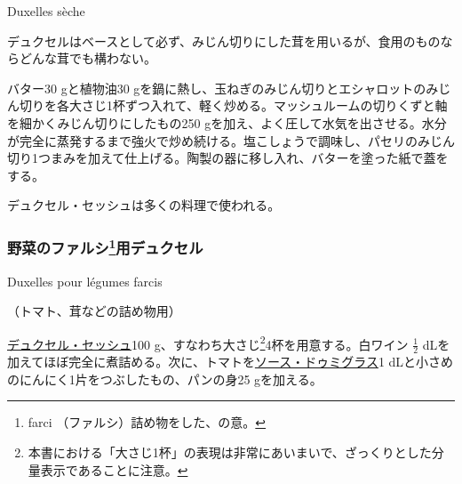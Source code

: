 \begin{recette}
\begin{frsubenv}

Duxelles sèche

\end{frsubenv}


デュクセルはベースとして必ず、みじん切りにした茸を用いるが、食用のものならどんな茸でも構わない。

バター30 gと植物油30
gを鍋に熱し、玉ねぎのみじん切りとエシャロットのみじん切りを各大さじ1杯ずつ入れて、軽く炒める。マッシュルームの切りくずと軸を細かくみじん切りにしたもの250
gを加え、よく圧して水気を出させる。水分が完全に蒸発するまで強火で炒め続ける。塩こしょうで調味し、パセリのみじん切り1つまみを加えて仕上げる。陶製の器に移し入れ、バターを塗った紙で蓋をする。

デュクセル・セッシュは多くの料理で使われる。

\atoaki{}

\hypertarget{duxelles-pour-legumes-farcis}{%
\subsubsection[野菜のファルシ用デュクセル]{\texorpdfstring{野菜のファルシ\footnote{farci
  （ファルシ）詰め物をした、の意。}用デュクセル}{野菜のファルシ用デュクセル}}\label{duxelles-pour-legumes-farcis}}

\begin{frsubenv}

Duxelles pour légumes farcis

\end{frsubenv}


（トマト、茸などの詰め物用）

\protect\hyperlink{duxelles-seche}{デュクセル・セッシュ}100
g、すなわち大さじ\footnote{本書における「大さじ1杯」の表現は非常にあいまいで、ざっくりとした分量表示であることに注意。}4杯を用意する。白ワイン
\(\frac{1}{2}\)
dLを加えてほぼ完全に煮詰める。次に、トマトを\protect\hyperlink{sauce-demi-glace}{ソース・ドゥミグラス}1
dLと小さめのにんにく1片をつぶしたもの、パンの身25 gを加える。


\end{recette}

